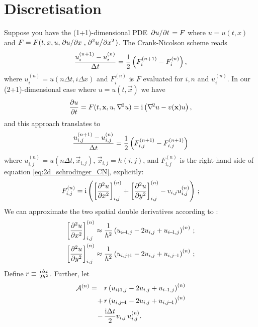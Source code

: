 \appendix

\section{Discretisation}\label{app:discretisation}

Suppose you have the (1+1)-dimensional PDE $\pdv*{u}{t}=F$ where $u=u(t,x)$ and $F = F(t, x, u, \pdv*{u}{x}, \pdv*[2]{u}{x})$. 
The Crank-Nicolson scheme reads  
\begin{equation}\label{eq:general_CN}
    \frac{u_i^{(n+1)}- u_{i}^{(n)} }{\Delta t} = \frac{1}{2} \left( F_i^{(n+1)}-F_i^{(n)} \right),
\end{equation}
where $u_i^{(n)} = u(n\Delta t, i\Delta x)$ and $F_i^{(n)}$ is $F$ evaluated for $i, n$ and $u_i^{(n)}$. In our (2+1)-dimensional case where $u= u(t, \vec{x})$ we have
\begin{align}\label{eq:2d_schrodinger_CN}
    \pdv{u}{t} = F(t, \mathbf{x}, u, \nabla^{\! 2}u)= \mathrm{i} \left( \nabla^{\! 2} u - v(\mathbf{x}) u \right),
\end{align}
and this approach translates to 
\begin{equation}\label{eq:2d_CN}
    \frac{u_{i,j}^{(n+1)}-u_{i,j}^{(n)}}{\Delta t} = \frac{1}{2} \left( F_{i,j}^{(n+1)} - F_{i,j}^{(n+1)} \right) 
\end{equation}
where $u_{i,j}^{(n)} = u(n\Delta t, \vec{x}_{i,j})$, $\vec{x}_{i,j}=h(i,j)$, and $F_{i,j}^{(n)}$ is the right-hand side of equation \eqref{eq:2d_schrodinger_CN}, explicitly:
\begin{equation}
    F_{i, j}^{(n)} = \mathrm{i} \left(   \left[ \pdv[2]{u}{x} \right]_{i,j}^{(n)} + \left[ \pdv[2]{u}{y} \right]_{i,j}^{(n)} - v_{i,j}u_{i,j}^{(n)} \right) \, ;
\end{equation}
We can approximate the two spatial double derivatives  according to :
\begin{subequations}
    \begin{align}
        \bracket{\pdv[2]{u}{x}}_{i,j}^{(n)} \approx \frac{1}{h^2} \closed{u_{i\!+\!1, j}-2u_{i,j} + u_{i\!-\!1, j}}^{(n)}\, ;\\
        \bracket{\pdv[2]{u}{y}}_{i,j}^{(n)} \approx \frac{1}{h^2} \closed{u_{i, j\!+\!1}-2u_{i,j} + u_{i, j\!-\!1}}^{(n)}\, ;
    \end{align}
\end{subequations}
Define $r\equiv \frac{\mathrm{i} \Delta t}{2h^2}$. Further, let
\begin{equation}
    \begin{split}
    \mathcal{A}^{(n)} = \quad&r\closed{ u_{i\!+\!1, j}-2u_{i,j} + u_{i\!-\!1, j}}^{(n)}  \\
    +\,&  r\closed{u_{i,j\!+\!1}-2u_{i,j} + u_{i,j\!-\!1}}^{(n)}\\ 
    -\,& \frac{\im \Delta t}{2} v_{i,j}\,u_{i,j}^{(n)}.
    \end{split}
\end{equation}
